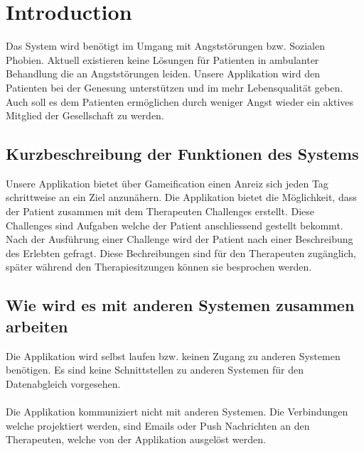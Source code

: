 \chapter{Introduction}

Das System wird ben\"{o}tigt im Umgang mit Angstst\"{o}rungen bzw. Sozialen Phobien. Aktuell existieren keine L\"{o}sungen f\"{u}r Patienten in ambulanter Behandlung die an Angstst\"{o}rungen leiden. Unsere Applikation wird den Patienten bei der Genesung unterst\"{u}tzen und im mehr Lebensqualit\"{a}t geben. Auch soll es dem Patienten erm\"{o}glichen durch weniger Angst wieder ein aktives Mitglied der Gesellschaft zu werden.

\section{Kurzbeschreibung der Funktionen des Systems}

Unsere Applikation bietet \"{u}ber \gls{Gameification} einen Anreiz sich jeden Tag schrittweise an ein Ziel anzun\"{a}hern. Die Applikation bietet die M\"{o}glichkeit, dass der Patient zusammen mit dem Therapeuten \gls{Challenges} erstellt. Diese \gls{Challenges} sind Aufgaben welche der Patient anschliessend gestellt bekommt. Nach der Ausf\"{u}hrung einer Challenge wird der Patient nach einer Beschreibung des Erlebten gefragt. Diese Bechreibungen sind f\"{u}r den Therapeuten zug\"{a}nglich, sp\"{a}ter w\"{a}hrend den Therapiesitzungen k\"{o}nnen sie besprochen werden.

\section{Wie wird es mit anderen Systemen zusammen arbeiten}

Die Applikation wird selbst laufen bzw. keinen Zugang zu anderen Systemen ben\"{o}tigen. Es sind keine Schnittstellen zu anderen Systemen f\"{u}r den Datenabgleich vorgesehen. \\ \\
Die Applikation kommuniziert nicht mit anderen Systemen. Die Verbindungen welche projektiert werden, sind Emails oder Push Nachrichten an den Therapeuten, welche von der Applikation ausgel\"{o}st werden.
